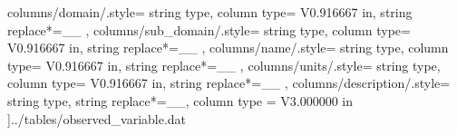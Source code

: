     columns/domain/.style={
            string type, 
            column type= V{0.916667 in}, 
            string replace*={_}{\_}
        },
    columns/sub_domain/.style={
            string type, 
            column type= V{0.916667 in}, 
            string replace*={_}{\_}
        },
    columns/name/.style={
            string type, 
            column type= V{0.916667 in}, 
            string replace*={_}{\_}
        },
    columns/units/.style={
            string type, 
            column type= V{0.916667 in}, 
            string replace*={_}{\_}
        },
    columns/description/.style={
            string type, 
            string replace*={_}{\_},
            column type = V{3.000000 in}
        }
    ]{../tables/observed_variable.dat}
